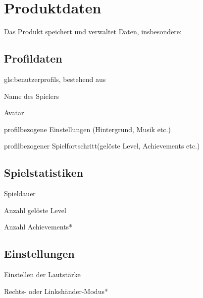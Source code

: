 \documentclass{scrartcl}
\begin{document}
\clearpage









\section{Produktdaten}
Das Produkt speichert und verwaltet Daten, insbesondere: 

\subsection{Profildaten}

\begin{pdlist}
    \item \label{produktdaten:profile} \glspl{gls:benutzerprofil}, bestehend aus 
    \begin{pdlist}
        \item \label{produktdaten:profile:name}Name des Spielers
        \item \label{produktdaten:profile:avatar}Avatar
        \item \label{produktdaten:profile:einstellungen}profilbezogene Einstellungen (Hintergrund, Musik etc.) 
        \item \label{produktdaten:profile:spielfortschritt}profilbezogener Spielfortschritt(gelöste Level, Achievements etc.)
    \end{pdlist}
\end{pdlist}

\subsection{Spielstatistiken}
\label{produktdaten:spielestatistiken}

\begin{pdlist}[resume]
    \item Spieldauer
    \item Anzahl gelöste Level
    \item Anzahl Achievements*
\end{pdlist}

\subsection{Einstellungen}
\label{produktdaten:einstellungen}

\begin{pdlist}[resume]
	\item Einstellen der Lautstärke
	\item Rechts- oder Linkshänder-Modus*
\end{pdlist}
\end{document}
